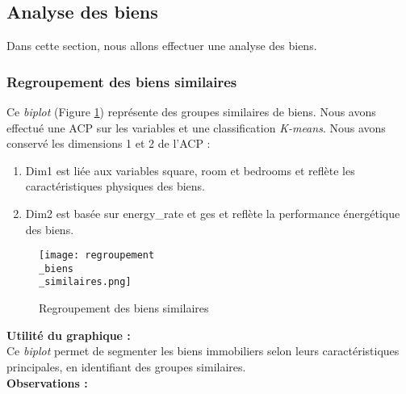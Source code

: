 \documentclass[a4paper, 12pt, twoside]{report}
\begin{document}
		\subsection{Analyse des biens}
			
			Dans cette section, nous allons effectuer une analyse des biens.

			\subsubsection{Regroupement des biens similaires}

			Ce {\it biplot} (Figure \ref{regroupementBiensSimilaires}) représente des groupes similaires de biens. Nous avons effectué une ACP sur les variables et une classification {\it K-means}. Nous avons conservé les dimensions 1 et 2 de l’ACP :
			\begin{enumerate}
				\item Dim1 est liée aux variables square, room et bedrooms et reflète les caractéristiques physiques des biens. 
				\item Dim2 est basée sur energy\_rate et ges et reflète la performance énergétique des biens. \\
			\end{enumerate}

			\begin{figure}[h]
				\centering
				\texttt{[image: regroupement\\\_biens\\\_similaires.png]}
				\caption{Regroupement des biens similaires}
				\label{regroupementBiensSimilaires}
			\end{figure}

			{\bf Utilité du graphique :} \\

			Ce {\it biplot} permet de segmenter les biens immobiliers selon leurs caractéristiques principales, en identifiant des groupes similaires. \\
				
			{\bf Observations :} \\
\end{document}
